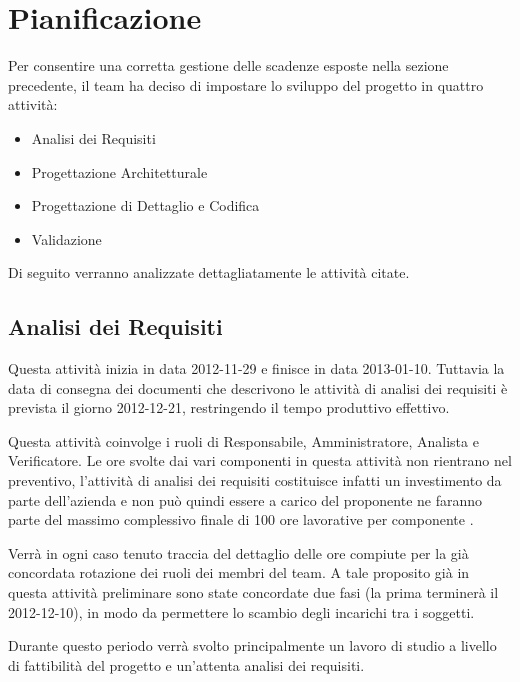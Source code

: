 \section{Pianificazione}
Per consentire una corretta gestione delle scadenze esposte nella sezione precedente, il team ha deciso di impostare lo sviluppo del progetto in quattro attività:

\begin{itemize}
\item Analisi dei Requisiti
\item Progettazione Architetturale
\item Progettazione di Dettaglio e Codifica
\item Validazione 
\end{itemize}

Di seguito verranno analizzate dettagliatamente le attività citate.

\subsection{Analisi dei Requisiti}
Questa attività inizia in data 2012-11-29 e finisce in data 2013-01-10. Tuttavia la data di consegna dei documenti che descrivono le attività di analisi dei requisiti è prevista il giorno 2012-12-21, restringendo il tempo produttivo effettivo.

Questa attività coinvolge i ruoli di Responsabile, Amministratore, Analista e Verificatore. Le ore svolte dai vari componenti in questa attività non rientrano nel preventivo, l'attività di analisi dei requisiti costituisce infatti un investimento da parte dell'azienda e non può quindi essere a carico del proponente ne faranno parte del massimo complessivo finale di 100 ore lavorative per componente .

Verrà in ogni caso tenuto traccia del dettaglio delle ore compiute per la già concordata rotazione dei ruoli dei membri del team. A tale proposito già in questa attività preliminare sono state concordate due fasi (la prima terminerà il 2012-12-10), in modo da permettere lo scambio degli incarichi tra i soggetti.

Durante questo periodo verrà svolto principalmente un lavoro di studio a livello di fattibilità del progetto e un'attenta analisi dei requisiti. 

